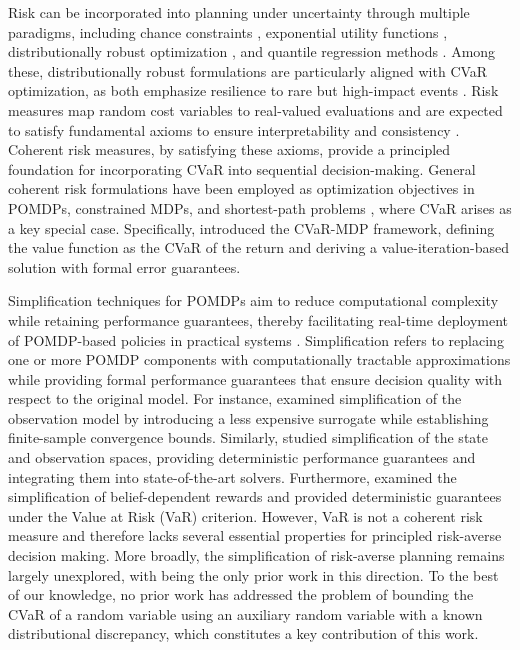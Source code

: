\documentclass[acmlarge, manuscript, screen, review, natbib=false, oneside]{acmart}
\begin{document}
Risk can be incorporated into planning under uncertainty through multiple paradigms, including chance constraints \cite{ono2015chance}, exponential utility functions \cite{koenig1994risk}, distributionally robust optimization \cite{xu2010distributionally, osogami2015robust, cubuktepe2021robust}, and quantile regression methods \cite{dabney2018distributional}. Among these, distributionally robust formulations are particularly aligned with CVaR optimization, as both emphasize resilience to rare but high-impact events \cite{chow2015risk}. Risk measures map random cost variables to real-valued evaluations and are expected to satisfy fundamental axioms to ensure interpretability and consistency \cite{majumdar2020should}. Coherent risk measures, by satisfying these axioms, provide a principled foundation for incorporating CVaR into sequential decision-making. General coherent risk formulations have been employed as optimization objectives in POMDPs, constrained MDPs, and shortest-path problems \cite{ahmadi2021constrained, ahmadi2020risk, ahmadi2021risk, dixit2023risk}, where CVaR arises as a key special case. Specifically, \cite{chow2015risk} introduced the CVaR-MDP framework, defining the value function as the CVaR of the return and deriving a value-iteration-based solution with formal error guarantees.

Simplification techniques for POMDPs aim to reduce computational complexity while retaining performance guarantees, thereby facilitating real-time deployment of POMDP-based policies in practical systems \cite{Papadimitriou1987TheCO}. Simplification refers to replacing one or more POMDP components with computationally tractable approximations while providing formal performance guarantees that ensure decision quality with respect to the original model. For instance, \cite{LevYehudi24aaai} examined simplification of the observation model by introducing a less expensive surrogate while establishing finite-sample convergence bounds. Similarly, \cite{BARENBOIM2026104442} studied simplification of the state and observation spaces, providing deterministic performance guarantees and integrating them into state-of-the-art solvers. Furthermore, \cite{Zhitnikov22ai} examined the simplification of belief-dependent rewards and provided deterministic guarantees under the Value at Risk (VaR) criterion. However, VaR is not a coherent risk measure and therefore lacks several essential properties for principled risk-averse decision making. More broadly, the simplification of risk-averse planning remains largely unexplored, with \cite{Zhitnikov22ai} being the only prior work in this direction. To the best of our knowledge, no prior work has addressed the problem of bounding the CVaR of a random variable using an auxiliary random variable with a known distributional discrepancy, which constitutes a key contribution of this work.
\end{document}

